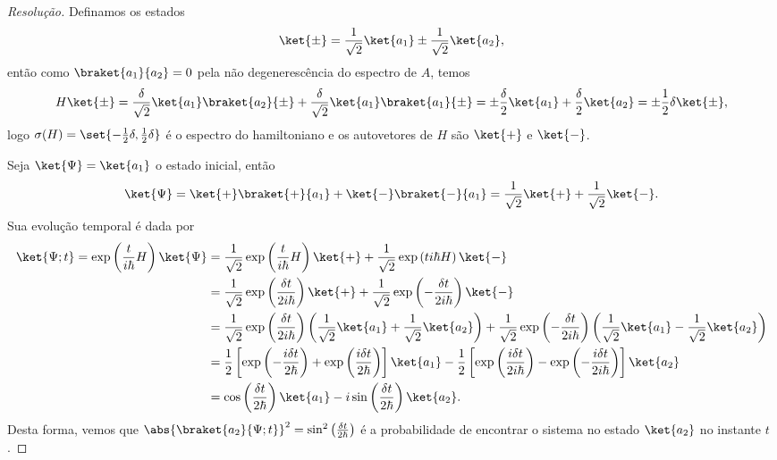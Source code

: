 \begin{proof}[Resolução]
    Definamos os estados
    \begin{equation*}
        \ket{\pm} = \frac1{\sqrt{2}} \ket{a_1} \pm \frac1{\sqrt{2}} \ket{a_2},
    \end{equation*}
    então como \(\braket{a_1}{a_2} = 0\) pela não degenerescência do espectro de \(A\), temos
    \begin{equation*}
        H\ket{\pm} = \frac{\delta}{\sqrt{2}} \ket{a_1} \braket{a_2}{\pm} + \frac{\delta}{\sqrt{2}}\ket{a_1} \braket{a_1}{\pm} = \pm\frac{\delta}{2} \ket{a_1} + \frac{\delta}{2}\ket{a_2} = \pm \frac12 \delta \ket{\pm},
    \end{equation*}
    logo \(\sigma(H) = \set{- \frac12 \delta, \frac12 \delta}\) é o espectro do hamiltoniano e os autovetores de \(H\) são \(\ket{+}\) e \(\ket{-}\).

    Seja \(\ket{\Psi} = \ket{a_1}\) o estado inicial, então 
    \begin{equation*}
        \ket{\Psi} = \ket{+}\braket{+}{a_1} + \ket{-}\braket{-}{a_1} = \frac{1}{\sqrt{2}} \ket{+} + \frac{1}{\sqrt{2}}\ket{-}.
    \end{equation*}
    Sua evolução temporal é dada por
    \begin{align*}
        \ket{\Psi; t} = \exp\left(\frac{t}{i\hbar} H\right)\ket{\Psi} 
        &= \frac{1}{\sqrt{2}}\exp\left(\frac{t}{i\hbar} H\right)\ket{+} + \frac{1}{\sqrt{2}} \exp\left({t}{i \hbar} H\right)\ket{-}\\
        &= \frac{1}{\sqrt{2}} \exp\left(\frac{\delta t}{2i \hbar}\right)\ket{+} + \frac{1}{\sqrt{2}} \exp\left(-\frac{\delta t}{2i \hbar}\right)\ket{-}\\
        &= \frac{1}{\sqrt{2}} \exp\left(\frac{\delta t}{2i \hbar}\right)\left(\frac1{\sqrt{2}}\ket{a_1} + \frac1{\sqrt{2}}\ket{a_2}\right) + \frac{1}{\sqrt{2}} \exp\left(-\frac{\delta t}{2i \hbar}\right)\left(\frac1{\sqrt{2}}\ket{a_1} - \frac1{\sqrt{2}}\ket{a_2}\right)\\
        &= \frac12\left[\exp\left(-\frac{i\delta t}{2\hbar}\right) + \exp\left(\frac{i\delta t}{2 \hbar}\right)\right]\ket{a_1} - \frac12\left[\exp\left(\frac{i \delta t}{2i \hbar}\right) - \exp\left(-\frac{i \delta t}{2i \hbar}\right)\right]\ket{a_2}\\
        &= \cos\left(\frac{\delta t}{2 \hbar}\right) \ket{a_1} - i \sin\left(\frac{\delta t}{2 \hbar}\right) \ket{a_2}.
    \end{align*}
    Desta forma, vemos que  \(\abs{\braket{a_2}{\Psi; t}}^2 = \sin^2\left(\frac{\delta t}{2 \hbar}\right)\) é a probabilidade de encontrar o sistema no estado \(\ket{a_2}\) no instante \(t\).
\end{proof}
